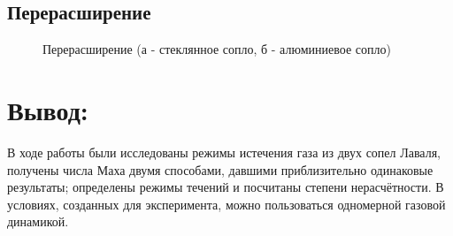 \documentclass[a4paper]{article}
\begin{document}
\subsection*{Перерасширение}

\begin{figure}[h]
\begin{minipage}[h]{0.5\linewidth}
\end{minipage}
\hfill
\begin{minipage}[h]{0.5\linewidth}
\end{minipage}
\caption{Перерасширение (а - стеклянное сопло, б - алюминиевое сопло)}
\label{ris:image1}
\end{figure}







\section*{Вывод:}
В ходе работы были исследованы режимы истечения газа из двух сопел Лаваля, получены числа Маха двумя способами, давшими приблизительно одинаковые результаты; определены режимы течений и посчитаны степени нерасчётности. В условиях, созданных для эксперимента, можно пользоваться одномерной газовой динамикой.
\end{document}

